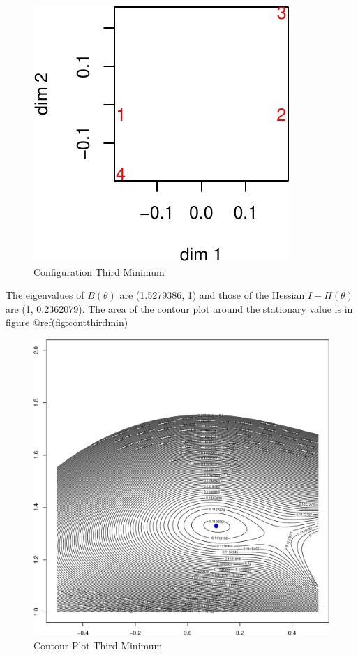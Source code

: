 \documentclass[
  12pt,
  letterpaper,
  DIV=11,
  numbers=noendperiod]{scrreprt}
\theoremstyle{remark}
\begin{document}
\begin{figure}[H]

{\centering \includegraphics{spaces_files/figure-pdf/confthirdmin-1.pdf}

}

\caption{Configuration Third Minimum}

\end{figure}%

The eigenvalues of \(B(\theta)\) are (1.5279386, 1) and those of the
Hessian \(I-H(\theta)\) are (1, 0.2362079). The area of the contour plot
around the stationary value is in figure @ref(fig:contthirdmin)

\begin{figure}[H]

{\centering \includegraphics{spaces_files/figure-pdf/contthirdmin-1.pdf}

}

\caption{Contour Plot Third Minimum}

\end{figure}%
\end{document}
